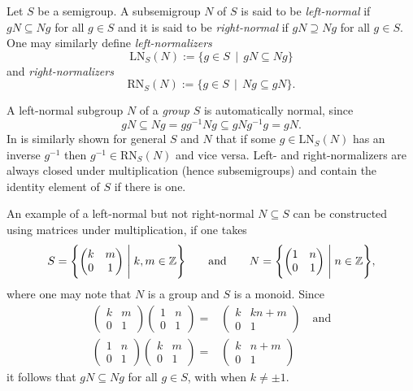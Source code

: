 \documentclass[12pt]{article}
\begin{document}
Let $S$ be a semigroup. A subsemigroup $N$ of $S$ is said to be 
\emph{left-normal} if $g N \subseteq N g$ for all $g \in S$ and 
it is said to be \emph{right-normal} if $g N \supseteq N g$ for all 
$g \in S$.
One may similarly define \emph{left-normalizers}
\[
  \mathrm{LN}_S(N) := \{ g \in S \,\mid\, gN \subseteq Ng \}
\]
and \emph{right-normalizers}
\[
  \mathrm{RN}_S(N) := \{ g \in S \,\mid\, Ng \subseteq gN \}
  \text{.}
\]

A left-normal subgroup $N$ of a \emph{group} $S$ is automatically 
normal, since
\[
  g N \subseteq
  N g =
  g g^{-1} N g \subseteq
  g N g^{-1} g = g N
  \text{.}
\]
In is similarly shown for general $S$ and $N$ that if some $g \in 
\mathrm{LN}_S(N)$ has an inverse $g^{-1}$ then $g^{-1} \in 
\mathrm{RN}_S(N)$ and vice versa. Left- and right-normalizers 
are always closed under multiplication (hence subsemigroups) 
and contain the identity element of $S$ if there is one.

An example of a left-normal but not right-normal $N \subseteq S$ 
can be constructed using matrices under multiplication, if one takes
\[
  S = \Biggl\{ \begin{pmatrix} k& m \\ 0& 1 \end{pmatrix} 
  \Biggm| k,m \in \mathbb{Z} \Biggr\}
  \qquad\text{and}\qquad
  N = \Biggl\{ \begin{pmatrix} 1& n \\ 0& 1 \end{pmatrix} 
  \Biggm| n \in \mathbb{Z} \Biggr\}
  \text{,}
\]
where one may note that $N$ is a group and $S$ is a monoid.
Since
\begin{align*}
  \begin{pmatrix} k& m \\ 0& 1 \end{pmatrix} 
  \begin{pmatrix} 1& n \\ 0& 1 \end{pmatrix} ={}&
  \begin{pmatrix} k& kn+m \\ 0& 1 \end{pmatrix} 
  \quad\text{and}\\
  \begin{pmatrix} 1& n \\ 0& 1 \end{pmatrix}
  \begin{pmatrix} k& m \\ 0& 1 \end{pmatrix} ={}& 
  \begin{pmatrix} k& n+m \\ 0& 1 \end{pmatrix} 
\end{align*}
it follows that $gN \subseteq Ng$ for all $g \in S$, with 
when $k \neq \pm 1$.
\end{document}
